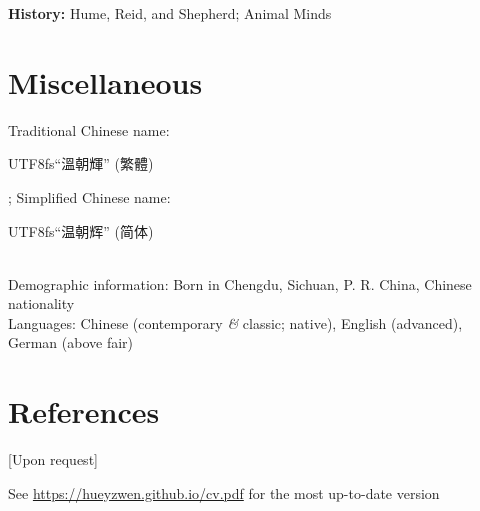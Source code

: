 \documentclass[10pt]{article}
\begin{document}
\hangindent=0.8cm \textbf{History:} Hume, Reid, and Shepherd; Animal Minds

\section*{Miscellaneous}

Traditional Chinese name: \begin{CJK}{UTF8}{fs}``溫朝輝'' (繁體)\end{CJK}; Simplified Chinese name: \begin{CJK}{UTF8}{fs}``温朝辉'' (简体)\end{CJK}\\
Demographic information: Born in Chengdu, Sichuan, P. R. China, Chinese nationality\\
Languages: Chinese (contemporary \emph{\&} classic; native), English (advanced), German (above fair)

\section*{References}

[Upon request]

\vspace*{\fill}\hspace*{\fill}\small{See \href{https://hueyzwen.github.io/cv.pdf}{https://hueyzwen.github.io/cv.pdf} for the most up-to-date version}
\end{document}
